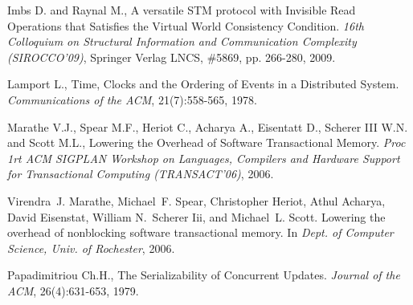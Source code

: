 \begin{thebibliography}{99}
{%

Imbs D. and Raynal M., 
A versatile   STM protocol with Invisible Read Operations
that Satisfies  the  Virtual World Consistency Condition.
{\it  16th  Colloquium   on  Structural   Information   and  Communication
Complexity  (SIROCCO'09)}, Springer Verlag LNCS,  \#5869,  pp. 266-280, 2009. 









Lamport L., 
Time, Clocks and the Ordering of Events in a Distributed System.
{\em Communications  of the ACM}, 21(7):558-565, 1978.



Marathe  V.J.,  Spear M.F., Heriot  C., Acharya A., Eisentatt  D., Scherer
III W.N. and Scott M.L.,
Lowering the Overhead of Software Transactional Memory. 
{\it  Proc 1rt  ACM SIGPLAN  Workshop on  Languages, Compilers  and Hardware
Support for Transactional Computing (TRANSACT'06)}, 2006. 



Virendra~J. Marathe, Michael~F. Spear, Christopher Heriot, Athul Acharya, David
  Eisenstat, William N.~Scherer Iii, and Michael~L. Scott.
\newblock Lowering the overhead of nonblocking software transactional memory.
\newblock In {\em Dept. of Computer Science, Univ. of Rochester}, 2006.






Papadimitriou Ch.H., 
The Serializability of Concurrent Updates. 
{\it Journal of the ACM},  26(4):631-653, 1979. 


}
\end{thebibliography}
